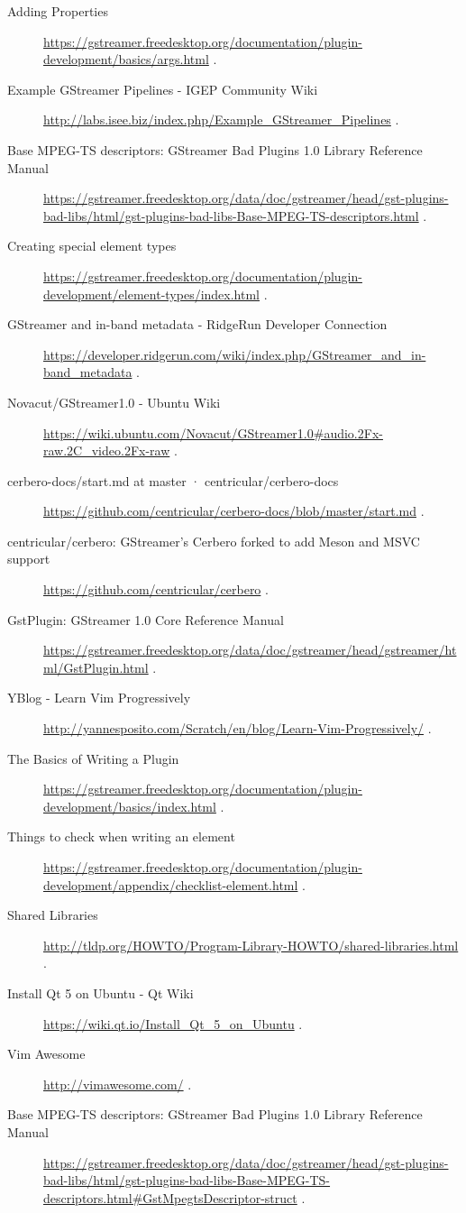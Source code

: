 \begin{description}
\item [Adding Properties] \url{https://gstreamer.freedesktop.org/documentation/plugin-development/basics/args.html} . 
\item [Example GStreamer Pipelines - IGEP Community Wiki] \url{http://labs.isee.biz/index.php/Example_GStreamer_Pipelines} . 
\item [Base MPEG-TS descriptors: GStreamer Bad Plugins 1.0 Library Reference Manual] \url{https://gstreamer.freedesktop.org/data/doc/gstreamer/head/gst-plugins-bad-libs/html/gst-plugins-bad-libs-Base-MPEG-TS-descriptors.html} . 
\item [Creating special element types] \url{https://gstreamer.freedesktop.org/documentation/plugin-development/element-types/index.html} . 
\item [GStreamer and in-band metadata - RidgeRun Developer Connection] \url{https://developer.ridgerun.com/wiki/index.php/GStreamer_and_in-band_metadata} . 
\item [Novacut/GStreamer1.0 - Ubuntu Wiki] \url{https://wiki.ubuntu.com/Novacut/GStreamer1.0#audio.2Fx-raw.2C_video.2Fx-raw} . 
\item [cerbero-docs/start.md at master · centricular/cerbero-docs] \url{https://github.com/centricular/cerbero-docs/blob/master/start.md} . 
\item [centricular/cerbero: GStreamer's Cerbero forked to add Meson and MSVC support] \url{https://github.com/centricular/cerbero} . 
\item [GstPlugin: GStreamer 1.0 Core Reference Manual] \url{https://gstreamer.freedesktop.org/data/doc/gstreamer/head/gstreamer/html/GstPlugin.html} . 
\item [YBlog - Learn Vim Progressively] \url{http://yannesposito.com/Scratch/en/blog/Learn-Vim-Progressively/} . 
\item [The Basics of Writing a Plugin] \url{https://gstreamer.freedesktop.org/documentation/plugin-development/basics/index.html} . 
\item [Things to check when writing an element] \url{https://gstreamer.freedesktop.org/documentation/plugin-development/appendix/checklist-element.html} . 
\item [Shared Libraries] \url{http://tldp.org/HOWTO/Program-Library-HOWTO/shared-libraries.html} . 
\item [Install Qt 5 on Ubuntu - Qt Wiki] \url{https://wiki.qt.io/Install_Qt_5_on_Ubuntu} . 
\item [Vim Awesome] \url{http://vimawesome.com/} . 
\item [Base MPEG-TS descriptors: GStreamer Bad Plugins 1.0 Library Reference Manual] \url{https://gstreamer.freedesktop.org/data/doc/gstreamer/head/gst-plugins-bad-libs/html/gst-plugins-bad-libs-Base-MPEG-TS-descriptors.html#GstMpegtsDescriptor-struct} . 

\end{description}
